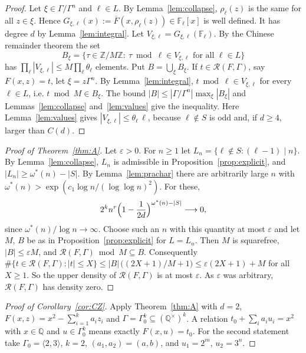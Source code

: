 \documentclass[11pt]{amsart}
\theoremstyle{definition}
\theoremstyle{remark}
\newcommand{\Z}{\mathbb{Z}}
\newcommand{\Q}{\mathbb{Q}}
\newcommand{\F}{\mathbb{F}}
\newcommand{\R}{\mathcal{R}}
\begin{document}
\begin{proof}
Let $\xi\in\Gamma/\Gamma^n$ and $\ell\in L$.
By Lemma~\ref{lem:collapse}, $\rho_\ell(z)$ is the same for all $z\in\xi$.
Hence $G_{\xi,\ell}(x):=\overline F(x,\rho_\ell(z))\in\F_\ell[x]$ is well defined.
It has degree $d$ by Lemma~\ref{lem:integral}.
Let $V_{\xi,\ell}=G_{\xi,\ell}(\F_\ell)$.
By the Chinese remainder theorem the set
\[
B_\xi=\{\tau\in\Z/M\Z:\ \tau\bmod\ell\in V_{\xi,\ell}\text{ for all }\ell\in L\}
\]
has $\prod_{\ell}|V_{\xi,\ell}|\le M\prod_\ell\theta_\ell$ elements.
Put $B=\bigcup_\xi B_\xi$.
If $t\in\R(F,\Gamma)$, say $F(x,z)=t$, let $\xi=z\Gamma^n$.
By Lemma~\ref{lem:integral}, $t\bmod\ell\in V_{\xi,\ell}$ for every $\ell\in L$, i.e. $t\bmod M\in B_\xi$.
The bound $|B|\le|\Gamma/\Gamma^n|\max_\xi|B_\xi|$ and Lemmas~\ref{lem:collapse} and~\ref{lem:values} give the inequality.
Here Lemma~\ref{lem:values} gives $|V_{\xi,\ell}|\le\theta_\ell\,\ell$, because $\ell\notin S$ is odd and, if $d\ge4$, larger than $C(d)$.
\end{proof}

\begin{proof}[Proof of Theorem~\ref{thm:A}]
Let $\varepsilon>0$.
For $n\ge1$ let $L_n=\{\ell\notin S:(\ell-1)\mid n\}$.
By Lemma~\ref{lem:collapse}, $L_n$ is admissible in Proposition~\ref{prop:explicit}, and $|L_n|\ge\omega^*(n)-|S|$.
By Lemma~\ref{lem:prachar} there are arbitrarily large $n$ with $\omega^*(n)>\exp(c_1\log n/(\log\log n)^2)$.
For these,
\[
2^kn^r\Bigl(1-\frac1{2d}\Bigr)^{\omega^*(n)-|S|}\longrightarrow0 ,
\]
since $\omega^*(n)/\log n\to\infty$.
Choose such an $n$ with this quantity at most $\varepsilon$ and let $M$, $B$ be as in Proposition~\ref{prop:explicit} for $L=L_n$.
Then $M$ is squarefree, $|B|\le\varepsilon M$, and $\R(F,\Gamma)\bmod M\subseteq B$.
Consequently $\#\{t\in\R(F,\Gamma):|t|\le X\}\le|B|\,\bigl((2X+1)/M+1\bigr)\le\varepsilon(2X+1)+M$ for all $X\ge1$.
So the upper density of $\R(F,\Gamma)$ is at most $\varepsilon$.
As $\varepsilon$ was arbitrary, $\R(F,\Gamma)$ has density zero.
\end{proof}

\begin{proof}[Proof of Corollary~\ref{cor:CZ}]
Apply Theorem~\ref{thm:A} with $d=2$, $F(x,z)=x^2-\sum_{i=1}^ka_iz_i$ and $\Gamma=\Gamma_0^k\subseteq(\Q^\times)^k$.
A relation $t_0+\sum_ia_iu_i=x^2$ with $x\in\Q$ and $u\in\Gamma_0^k$ means exactly $F(x,u)=t_0$.
For the second statement take $\Gamma_0=\langle2,3\rangle$, $k=2$, $(a_1,a_2)=(a,b)$, and $u_1=2^m$, $u_2=3^n$.
\end{proof}
\end{document}
